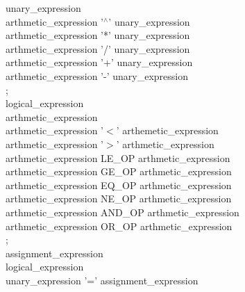 \documentclass[11pt]{article}
\begin{document}
{\hspace*{1cm}  unary\_expression\\
\hspace*{1cm}    arthmetic\_expression '$^\wedge$' unary\_expression\\
\hspace*{1cm}   arthmetic\_expression '*' unary\_expression\\
\hspace*{1cm}   arthmetic\_expression '/' unary\_expression\\
\hspace*{1cm}   arthmetic\_expression '+' unary\_expression\\
\hspace*{1cm}   arthmetic\_expression '-' unary\_expression\\
\hspace*{1cm};\\
logical\_expression\\
\hspace*{1cm} arthmetic\_expression\\
\hspace*{1cm}   arthmetic\_expression '$<$' arthemetic\_expression\\
\hspace*{1cm}   arthmetic\_expression '$>$' arthmetic\_expression\\
\hspace*{1cm}   arthmetic\_expression LE\_OP arthmetic\_expression\\
\hspace*{1cm}   arthmetic\_expression GE\_OP arthmetic\_expression\\
\hspace*{1cm}   arthmetic\_expression EQ\_OP arthmetic\_expression\\
\hspace*{1cm}   arthmetic\_expression NE\_OP arthmetic\_expression\\
\hspace*{1cm}   arthmetic\_expression AND\_OP arthmetic\_expression\\
\hspace*{1cm}   arthmetic\_expression OR\_OP arthmetic\_expression\\
\hspace*{1cm};\\
assignment\_expression\\
\hspace*{1cm} logical\_expression\\
\hspace*{1cm}   unary\_expression '=' assignment\_expression\\
}
\end{document}
